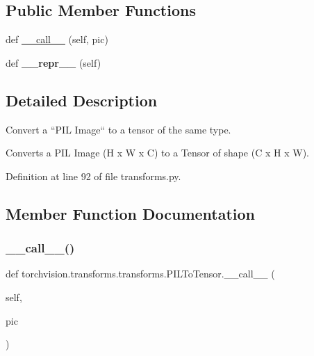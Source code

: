 \subsection*{Public Member Functions}
\begin{DoxyCompactItemize}
\item 
def \hyperlink{classtorchvision_1_1transforms_1_1transforms_1_1PILToTensor_a9537959a734d5d108d1cb548bd97b631}{\+\_\+\+\_\+call\+\_\+\+\_\+} (self, pic)
\item 
\mbox{\label{classtorchvision_1_1transforms_1_1transforms_1_1PILToTensor_a2b78660c9a51448d6addb8e52a6ac67e}} 
def {\bfseries \+\_\+\+\_\+repr\+\_\+\+\_\+} (self)
\end{DoxyCompactItemize}


\subsection{Detailed Description}
\begin{DoxyVerb}Convert a ``PIL Image`` to a tensor of the same type.

Converts a PIL Image (H x W x C) to a Tensor of shape (C x H x W).
\end{DoxyVerb}
 

Definition at line 92 of file transforms.\+py.



\subsection{Member Function Documentation}
\mbox{\label{classtorchvision_1_1transforms_1_1transforms_1_1PILToTensor_a9537959a734d5d108d1cb548bd97b631}} 
\subsubsection{\texorpdfstring{\+\_\+\+\_\+call\+\_\+\+\_\+()}{\_\_call\_\_()}}
{\footnotesize\ttfamily def torchvision.\+transforms.\+transforms.\+P\+I\+L\+To\+Tensor.\+\_\+\+\_\+call\+\_\+\+\_\+ (\begin{DoxyParamCaption}\item[{}]{self,  }\item[{}]{pic }\end{DoxyParamCaption})}

